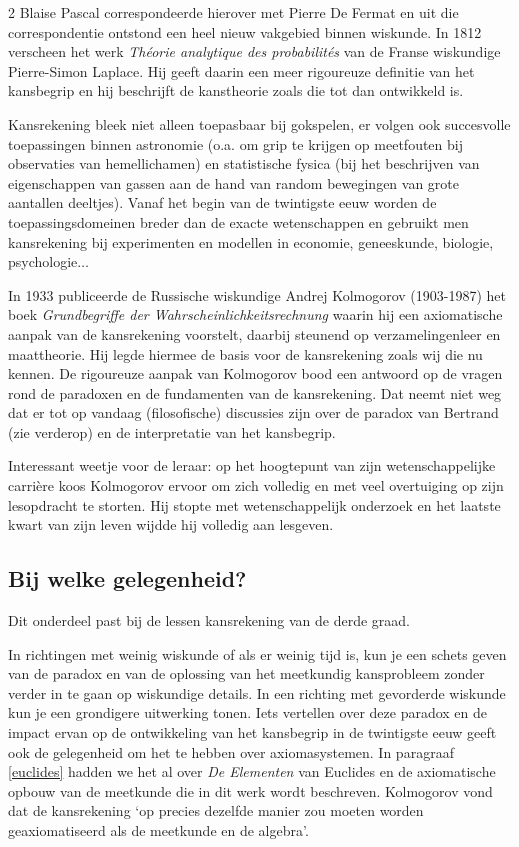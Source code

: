 \begin{multicols}{2}
	Blaise Pascal correspondeerde hierover met Pierre De Fermat en uit die correspondentie ontstond een heel nieuw vakgebied binnen wiskunde. In 1812 verscheen het werk \textit{Théorie analytique des probabilités} van de Franse wiskundige Pierre-Simon Laplace. Hij geeft daarin een meer rigoureuze definitie van het kansbegrip en hij beschrijft de kanstheorie zoals die tot dan ontwikkeld is.
	
	Kansrekening bleek niet alleen toepasbaar bij gokspelen, er volgen ook succesvolle toepassingen binnen astronomie (o.a. om grip te krijgen op meetfouten bij observaties van hemellichamen) en statistische fysica (bij het beschrijven van eigenschappen van gassen aan de hand van random bewegingen van grote aantallen deeltjes). Vanaf het begin van de twintigste eeuw worden de toepassingsdomeinen breder dan de exacte wetenschappen en gebruikt men kansrekening bij experimenten en modellen in economie, geneeskunde, biologie, psychologie$\ldots$ 
		
	In 1933 publiceerde de Russische wiskundige Andrej Kolmogorov (1903-1987) het boek \textit{Grundbegriffe der Wahrscheinlichkeitsrechnung} waarin hij een axiomatische aanpak van de kansrekening voorstelt, daarbij steunend op verzamelingenleer en maattheorie. Hij legde hiermee de basis voor de kansrekening zoals wij die nu kennen. De rigoureuze aanpak van Kolmogorov bood een antwoord op de vragen rond de paradoxen en de fundamenten van de kansrekening. Dat neemt niet weg dat er tot op vandaag (filosofische) discussies zijn over de paradox van Bertrand (zie verderop) en de interpretatie van het kansbegrip.

 Interessant weetje voor de leraar: op het hoogtepunt van zijn wetenschappelijke carrière koos Kolmogorov ervoor om zich volledig en met veel overtuiging op zijn lesopdracht te storten. Hij stopte met wetenschappelijk onderzoek en het laatste kwart van zijn leven wijdde hij volledig aan lesgeven. 
 
		
	\subsection*{Bij welke gelegenheid?}
	Dit onderdeel past bij de lessen kansrekening van de derde graad.
	
	In richtingen met weinig wiskunde of als er weinig tijd is, kun je een schets geven van de paradox en van de oplossing van het meetkundig kansprobleem zonder verder in te gaan op wiskundige details. In een richting met gevorderde wiskunde kun je een grondigere uitwerking tonen. Iets vertellen over deze paradox en de impact ervan op de ontwikkeling van het kansbegrip in de twintigste eeuw geeft ook de gelegenheid om het te hebben over axiomasystemen. In paragraaf \ref{euclides} hadden we het al over \textit{De Elementen} van Euclides en de axiomatische opbouw van de meetkunde die in dit werk wordt beschreven. Kolmogorov vond dat de kansrekening `op precies dezelfde manier zou moeten worden geaxiomatiseerd als de meetkunde en de algebra'.
	

\end{multicols}
